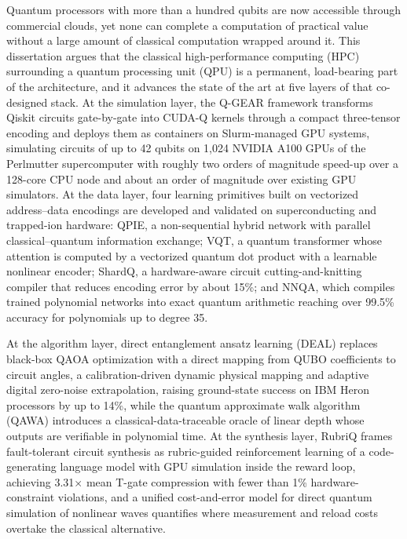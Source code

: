 \begin{ttuabstract}
Quantum processors with more than a hundred qubits are now accessible through commercial clouds, yet none can complete a computation of practical value without a large amount of classical computation wrapped around it. This dissertation argues that the classical high-performance computing (HPC) surrounding a quantum processing unit (QPU) is a permanent, load-bearing part of the architecture, and it advances the state of the art at five layers of that co-designed stack. At the simulation layer, the Q-GEAR framework transforms Qiskit circuits gate-by-gate into CUDA-Q kernels through a compact three-tensor encoding and deploys them as containers on Slurm-managed GPU systems, simulating circuits of up to 42 qubits on 1,024 NVIDIA A100 GPUs of the Perlmutter supercomputer with roughly two orders of magnitude speed-up over a 128-core CPU node and about an order of magnitude over existing GPU simulators. At the data layer, four learning primitives built on vectorized address--data encodings are developed and validated on superconducting and trapped-ion hardware: QPIE, a non-sequential hybrid network with parallel classical--quantum information exchange; VQT, a quantum transformer whose attention is computed by a vectorized quantum dot product with a learnable nonlinear encoder; ShardQ, a hardware-aware circuit cutting-and-knitting compiler that reduces encoding error by about 15\%; and NNQA, which compiles trained polynomial networks into exact quantum arithmetic reaching over 99.5\% accuracy for polynomials up to degree 35.

At the algorithm layer, direct entanglement ansatz learning (DEAL) replaces black-box QAOA optimization with a direct mapping from QUBO coefficients to circuit angles, a calibration-driven dynamic physical mapping and adaptive digital zero-noise extrapolation, raising ground-state success on IBM Heron processors by up to 14\%, while the quantum approximate walk algorithm (QAWA) introduces a classical-data-traceable oracle of linear depth whose outputs are verifiable in polynomial time. At the synthesis layer, RubriQ frames fault-tolerant circuit synthesis as rubric-guided reinforcement learning of a code-generating language model with GPU simulation inside the reward loop, achieving 3.31$\times$ mean T-gate compression with fewer than 1\% hardware-constraint violations, and a unified cost-and-error model for direct quantum simulation of nonlinear waves quantifies where measurement and reload costs overtake the classical alternative.


\end{ttuabstract}
